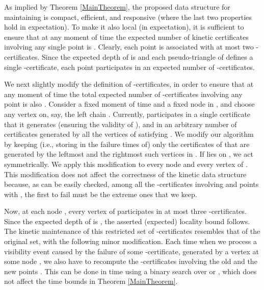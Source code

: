 \documentclass[11pt]{article}
\begin{document}
\medskip
{} As implied by Theorem \ref{MainTheorem}, the proposed data structure for maintaining  is compact, efficient, and responsive (where the last two properties hold in expectation). To make it also local (in expectation), it is sufficient to ensure that at any moment of time the expected number of kinetic certificates involving any single point is . Clearly, each point is associated with at most two -certificates.
Since the expected depth of  is  and each pseudo-triangle of  defines a single -certificate, each point participates in an expected number of  -certificates.

We next slightly modify the definition of -certificates, in order to ensure that at any moment of time the total expected number of -certificates involving any point is also .
Consider a fixed moment of time  and a fixed node  in , and choose any vertex  on, say, the left chain .
Currently,  participates in a single certificate that it generates (ensuring the validity of ), and in an arbitrary number of certificates generated by all the vertices  of  satisfying .
We modify our algorithm by keeping (i.e., storing in  the failure times of) only the certificates of  that are generated by the leftmost and the rightmost such vertices  in . 
If  lies on , we act symmetrically. We apply this modification to every node  and every vertex of .
This modification does not affect the correctness of the kinetic data structure because, as can be easily checked, among all the -certificates involving  and points  with , the first to fail must be the extreme ones that we keep.

Now, at each node , every vertex of  participates in at most three -certificates. Since the expected depth of  is , the asserted (expected) locality bound follows. The kinetic maintenance of this restricted set of -certificates resembles that of the original set, with the following minor modification. Each time when we process a visibility event caused by the failure of some -certificate, generated by a vertex  at some node , we also have to recompute the -certificates involving the old and the new points . This can be done in  time using a binary search over  or , which does not affect the time bounds in Theorem \ref{MainTheorem}.

 
\end{document}

